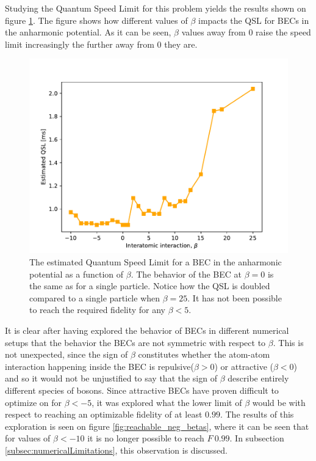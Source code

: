 \documentclass[aps,pra,reprint,superscriptaddress]{revtex4-1}
\begin{document}
Studying the Quantum Speed Limit for this problem yields the results shown on figure \ref{fig:QSL}. The figure shows how different values of $\beta$ impacts the QSL for BECs in the anharmonic potential. As it can be seen, $\beta$ values away from 0 raise the speed limit increasingly the further away from 0 they are. \\

\begin{figure}[h]
	\includegraphics[width=\columnwidth]{graphics/exploration/QSL.pdf}
	\caption{The estimated Quantum Speed Limit for a BEC in the anharmonic potential as a function of $\beta$. The behavior of the BEC at $\beta=0$ is the same as for a single particle. Notice how the QSL is doubled compared to a single particle when $\beta=25$. It has not been possible to reach the required fidelity for any $\beta < 5$.}
	\label{fig:QSL}
\end{figure}

It is clear after having explored the behavior of BECs in different numerical setups that the behavior the BECs are not symmetric with respect to $\beta$. This is not unexpected, since the sign of $\beta$ constitutes whether the atom-atom interaction happening inside the BEC is repulsive($\beta>0$) or attractive ($\beta<0$) and so it would not be unjustified to say that the sign of $\beta$ describe entirely different species of bosons. Since attractive BECs have proven difficult to optimize on for $\beta<-5$, it was explored what the lower limit of $\beta$ would be with respect to reaching an optimizable fidelity of at least $0.99$. The results of this exploration is seen on figure \ref{fig:reachable_neg_betas}, where it can be seen that for values of $\beta<-10$ it is no longer possible to reach $F~0.99$. In subsection \ref{subsec:numericalLimitations}, this observation is discussed.
\end{document}
